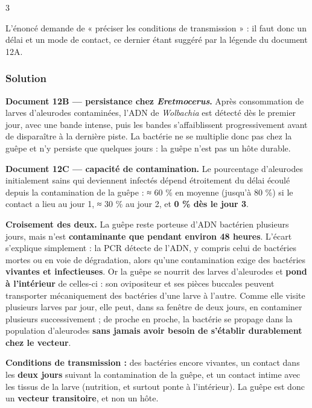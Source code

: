 \documentclass[11pt,a4paper]{article}
\begin{document}
\begin{indication}{3}

L'énoncé demande de « préciser les conditions de transmission » : il faut donc un délai et un mode de contact, ce dernier étant suggéré par la légende du document 12A.

\end{indication}

\hypertarget{solution-69}{%
\subsubsection{Solution}\label{solution-69}}

\textbf{Document 12B --- persistance chez \emph{Eretmocerus}.} Après consommation de larves d'aleurodes contaminées, l'ADN de \emph{Wolbachia} est détecté dès le premier jour, avec une bande intense, puis les bandes s'affaiblissent progressivement avant de disparaître à la dernière piste. La bactérie ne se multiplie donc pas chez la guêpe et n'y persiste que quelques jours : la guêpe n'est pas un hôte durable.

\textbf{Document 12C --- capacité de contamination.} Le pourcentage d'aleurodes initialement sains qui deviennent infectés dépend étroitement du délai écoulé depuis la contamination de la guêpe : ≈ 60 \% en moyenne (jusqu'à 80 \%) si le contact a lieu au jour 1, ≈ 30 \% au jour 2, et \textbf{0 \% dès le jour 3}.

\textbf{Croisement des deux.} La guêpe reste porteuse d'ADN bactérien plusieurs jours, mais n'est \textbf{contaminante que pendant environ 48 heures}. L'écart s'explique simplement : la PCR détecte de l'ADN, y compris celui de bactéries mortes ou en voie de dégradation, alors qu'une contamination exige des bactéries \textbf{vivantes et infectieuses}. Or la guêpe se nourrit des larves d'aleurodes et \textbf{pond à l'intérieur} de celles-ci : son ovipositeur et ses pièces buccales peuvent transporter mécaniquement des bactéries d'une larve à l'autre. Comme elle visite plusieurs larves par jour, elle peut, dans sa fenêtre de deux jours, en contaminer plusieurs successivement ; de proche en proche, la bactérie se propage dans la population d'aleurodes \textbf{sans jamais avoir besoin de s'établir durablement chez le vecteur}.

\textbf{Conditions de transmission :} des bactéries encore vivantes, un contact dans les \textbf{deux jours} suivant la contamination de la guêpe, et un contact intime avec les tissus de la larve (nutrition, et surtout ponte à l'intérieur). La guêpe est donc un \textbf{vecteur transitoire}, et non un hôte.
\end{document}
